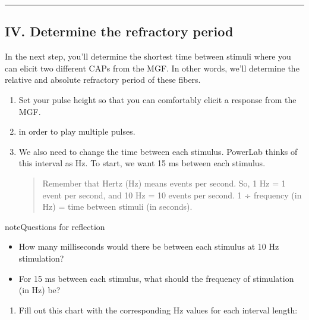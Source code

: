 \documentclass[letterpaper,10pt,english]{jupyterBook}
\begin{document}
\bigskip\hrule\bigskip



\subsection{IV. Determine the refractory period}
\label{\detokenize{Earthworm:iv-determine-the-refractory-period}}
\sphinxAtStartPar
In the next step, you’ll determine the shortest time between stimuli where you can elicit two different CAPs from the MGF. In other words, we’ll determine the relative and absolute refractory period of these fibers.
\begin{enumerate}
%
\item {} 
\sphinxAtStartPar
Set your pulse height so that you can comfortably elicit a response from the MGF.

\item {} 
\sphinxAtStartPar
{} in order to play multiple pulses.

\item {} 
\sphinxAtStartPar
We also need to change the time between each stimulus. PowerLab thinks of this interval as Hz. To start, we want 15 ms between each stimulus.
\begin{quote}

\sphinxAtStartPar
{} Remember that Hertz (Hz) means events per second. So, 1 Hz = 1 event per second, and 10 Hz = 10 events per second. 1 ÷ frequency (in Hz) = time between stimuli (in seconds).
\end{quote}

\end{enumerate}

\begin{sphinxadmonition}{note}{Questions for reflection}
\begin{itemize}
\item {} 
\sphinxAtStartPar
How many milliseconds would there be between each stimulus at 10 Hz stimulation?

\item {} 
\sphinxAtStartPar
For 15 ms between each stimulus, what should the frequency of stimulation (in Hz) be?

\end{itemize}
\end{sphinxadmonition}
\begin{enumerate}
%
\setcounter{enumi}{3}
\item {} 
\sphinxAtStartPar
Fill out this chart with the corresponding Hz values for each interval length:

\end{enumerate}
\end{document}
